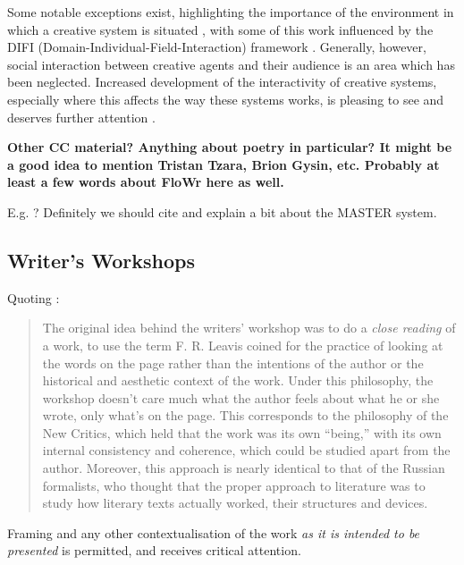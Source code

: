 Some notable exceptions exist, highlighting the importance of the
environment in which a creative system is situated \cite{mcgraw93,
  sosa09, perezyperez10MM, pease10, saunders12}, with some of this
work influenced by the DIFI (Domain-Individual-Field-Interaction)
framework \cite{csik88}. Generally, however, social interaction
between creative agents and their audience is an area which has been
neglected. Increased development of the interactivity of creative
systems, especially where this affects the way these systems works, is
pleasing to see and deserves further attention
\cite{coltonwiggins12}.

\begin{mdframed}
\textbf{Other CC material?  Anything about poetry in particular?  It
  might be a good idea to mention Tristan Tzara, Brion Gysin, etc.
  Probably at least a few words about FloWr here as well.}

 E.g. \cite{jordanous10}?  Definitely we should cite
\cite{misztal2014poetry} and explain a bit about the MASTER system.
\end{mdframed}

\subsection{Writer's Workshops}

Quoting \cite[pp. 2--3]{gabriel2002writer}:

\begin{quote}
The original idea behind the writers' workshop was to do a \emph{close
  reading} of a work, to use the term F. R. Leavis coined for the
practice of looking at the words on the page rather than the
intentions of the author or the historical and aesthetic context of
the work.  Under this philosophy, the workshop doesn't care much what
the author feels about what he or she wrote, only what's on the page.
This corresponds to the philosophy of the New Critics, which held that
the work was its own ``being,'' with its own internal consistency and
coherence, which could be studied apart from the author.  Moreover,
this approach is nearly identical to that of the Russian formalists,
who thought that the proper approach to literature was to study how
literary texts actually worked, their structures and devices.
\end{quote}

Framing and any other contextualisation of the work \emph{as it is
  intended to be presented} is permitted, and receives critical attention.

